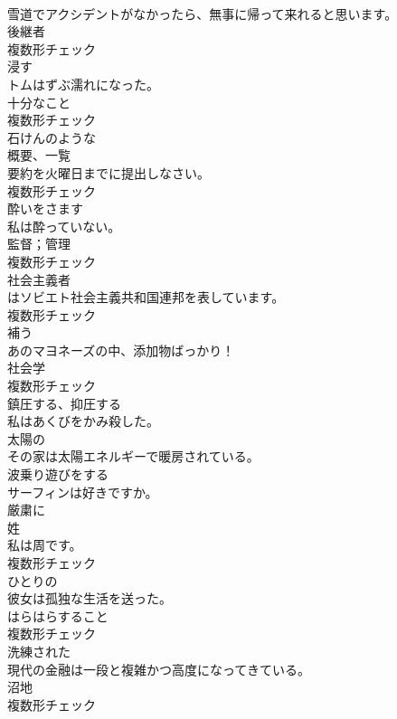 \documentclass[8pt]{extreport}
\begin{document}
\begin{CJK}{UTF8}{min}
\\	雪道でアクシデントがなかったら、無事に帰って来れると思います。	
\\	[名詞]	後継者	
\\	複数形チェック
\\	[動詞]	浸す	
\\	トムはずぶ濡れになった。	
\\	[名詞]	十分なこと	
\\	複数形チェック
\\	[形容詞]	石けんのような	
\\	[名詞]	概要、一覧	
\\	要約を火曜日までに提出しなさい。	
\\	複数形チェック
\\	[動詞]	酔いをさます	
\\	私は酔っていない。	
\\	[名詞]	監督；管理	
\\	複数形チェック
\\	[名詞]	社会主義者	
\\	はソビエト社会主義共和国連邦を表しています。	
\\	複数形チェック
\\	[動詞]	補う	
\\	あのマヨネーズの中、添加物ばっかり！	
\\	[名詞]	社会学	
\\	複数形チェック
\\	[動詞]	鎮圧する、抑圧する	
\\	私はあくびをかみ殺した。	
\\	[形容詞]	太陽の	
\\	その家は太陽エネルギーで暖房されている。	
\\	[動詞]	波乗り遊びをする	
\\	サーフィンは好きですか。	
\\	[副詞]	厳粛に	
\\	[名詞]	姓	
\\	私は周です。	
\\	複数形チェック
\\	[形容詞]	ひとりの	
\\	彼女は孤独な生活を送った。	
\\	[名詞]	はらはらすること	
\\	複数形チェック
\\	[形容詞]	洗練された	
\\	現代の金融は一段と複雑かつ高度になってきている。	
\\	[名詞]	沼地	
\\	複数形チェック

\end{CJK}
\end{document}
